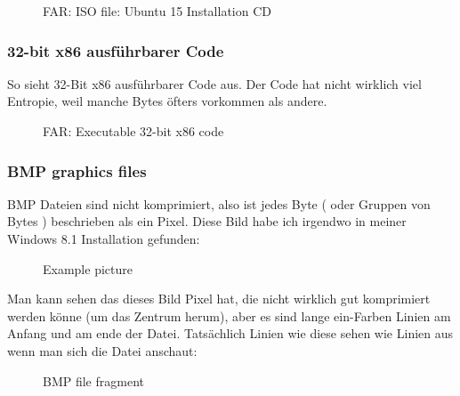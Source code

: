 \begin{figure}[H]
\centering
{}
\caption{FAR: ISO file: Ubuntu 15 Installation \ac{CD}}
\end{figure}

\clearpage
\subsubsection{32-bit x86 ausführbarer Code} 

So sieht 32-Bit x86 ausführbarer Code aus. 
Der Code hat nicht wirklich viel Entropie, weil manche Bytes öfters vorkommen als andere.

\begin{figure}[H]
\centering
{}
\caption{FAR: Executable 32-bit x86 code}
\end{figure}


\clearpage
\subsubsection{BMP graphics files}


BMP Dateien sind nicht komprimiert, also ist jedes Byte ( oder Gruppen von Bytes ) beschrieben als
ein Pixel. Diese Bild habe ich irgendwo in meiner Windows 8.1 Installation gefunden: 

\begin{figure}[H]
\centering
{}
\caption{Example picture}
\end{figure}

Man kann sehen das dieses Bild Pixel hat, die nicht wirklich gut komprimiert werden könne (um das Zentrum herum),
aber es sind lange ein-Farben Linien am Anfang und am ende der Datei. Tatsächlich Linien wie diese sehen wie Linien aus
wenn man sich die Datei anschaut:

\begin{figure}[H]
\centering
{}
\caption{BMP file fragment}
\end{figure}

